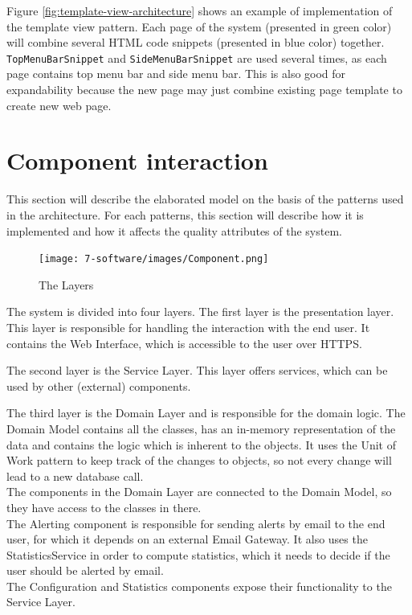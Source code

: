 Figure \ref{fig:template-view-architecture} shows an example of implementation of the template view pattern. Each page of the system (presented in green color) will combine several HTML code snippets (presented in blue color) together. \texttt{TopMenuBarSnippet} and \texttt{SideMenuBarSnippet} are used several times, as each page contains top menu bar and side menu bar. This is also good for expandability because the new page may just combine existing page template to create new web page.


\section{Component interaction}
This section will describe the elaborated model on the basis of the patterns used in the architecture. For each patterns, this section will describe how it is implemented and how it affects the quality attributes of the system.

\begin{figure}[H]
\centering
\texttt{[image: 7-software/images/Component.png]}
\caption{The Layers}
\label{fig:layers}
\end{figure}
The system is divided into four layers. The first layer is the presentation layer. This layer is responsible for handling the interaction with the end user. It contains the Web Interface, which is accessible to the user over HTTPS.

The second layer is the Service Layer. This layer offers services, which can be used by other (external) components.

The third layer is the Domain Layer and is responsible for the domain logic. The Domain Model contains all the classes, has an in-memory representation of the data and contains the logic which is inherent to the objects.
It uses the Unit of Work pattern to keep track of the changes to objects, so not every change will lead to a new database call. \\
The components in the Domain Layer are connected to the Domain Model, so they have access to the classes in there. \\
The Alerting component is responsible for sending alerts by email to the end user, for which it depends on an external Email Gateway. It also uses the StatisticsService in order to compute statistics, which it needs to decide if the user should be alerted by email. \\
The Configuration and Statistics components expose their functionality to the Service Layer.

